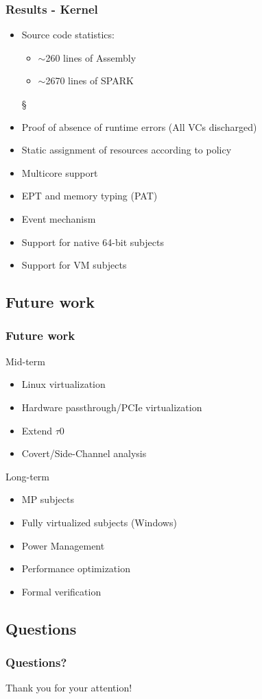 \documentclass[xcolor={dvipsnames}]{beamer}
\begin{document}
\begin{frame}\frametitle{Results - Kernel}
\begin{itemize}
	\item Source code statistics:
	\begin{itemize}
		\item $\sim$260 lines of Assembly
		\item $\sim$2670 lines of SPARK
	\end{itemize}§
	\item Proof of absence of runtime errors (All VCs discharged)
	\item Static assignment of resources according to policy
	\item Multicore support
	\item EPT and memory typing (PAT)
	\item Event mechanism
	\item Support for native 64-bit subjects
	\item Support for VM subjects
\end{itemize}
\end{frame}

\subsection{Future work}
\begin{frame}\frametitle{Future work}
\begin{block}{Mid-term}
	\begin{itemize}
		\item Linux virtualization
		\item Hardware passthrough/PCIe virtualization
		\item Extend $\tau$0
		\item Covert/Side-Channel analysis
	\end{itemize}
\end{block}
\begin{block}{Long-term}
	\begin{itemize}
		\item MP subjects
		\item Fully virtualized subjects (Windows)
		\item Power Management
		\item Performance optimization
		\item Formal verification
	\end{itemize}
\end{block}
\end{frame}

\subsection{Questions}
\begin{frame}\frametitle{Questions?}
\begin{center}
	Thank you for your attention!
\end{center}
\end{frame}
\end{document}
